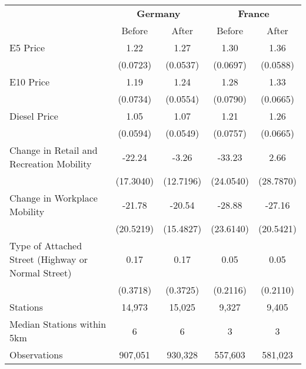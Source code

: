\begin{tabular}{l*{4}{c}}
\toprule
                    &\multicolumn{2}{c}{\textbf{Germany}}&\multicolumn{2}{c}{\textbf{France}}\\\cmidrule(lr){2-3}\cmidrule(lr){4-5}
                    &\multicolumn{1}{c}{Before}&\multicolumn{1}{c}{After}&\multicolumn{1}{c}{Before}&\multicolumn{1}{c}{After}\\
\midrule
E5 Price            &        1.22&        1.27&        1.30&        1.36\\
                    &    (0.0723)&    (0.0537)&    (0.0697)&    (0.0588)\\
E10 Price           &        1.19&        1.24&        1.28&        1.33\\
                    &    (0.0734)&    (0.0554)&    (0.0790)&    (0.0665)\\
Diesel Price        &        1.05&        1.07&        1.21&        1.26\\
                    &    (0.0594)&    (0.0549)&    (0.0757)&    (0.0665)\\
Change in Retail and Recreation Mobility&      -22.24&       -3.26&      -33.23&        2.66\\
                    &   (17.3040)&   (12.7196)&   (24.0540)&   (28.7870)\\
Change in Workplace Mobility&      -21.78&      -20.54&      -28.88&      -27.16\\
                    &   (20.5219)&   (15.4827)&   (23.6140)&   (20.5421)\\
Type of Attached Street (Highway or Normal Street)&        0.17&        0.17&        0.05&        0.05\\
                    &    (0.3718)&    (0.3725)&    (0.2116)&    (0.2110)\\
\midrule
Stations            &      14,973&      15,025&       9,327&       9,405\\
Median Stations within 5km&           6&           6&           3&           3\\
Observations        &     907,051&     930,328&     557,603&     581,023\\
\bottomrule
\end{tabular}
